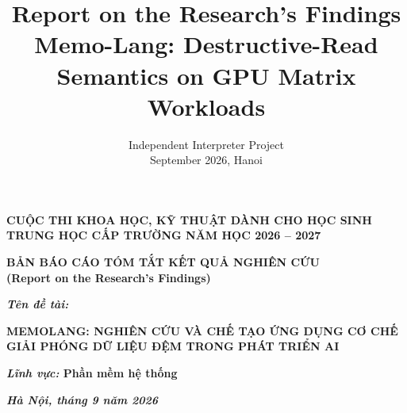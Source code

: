 \documentclass[a4paper]{article}
\begin{document}
	
	\title{Report on the Research's Findings \\
		{\large Memo-Lang: Destructive-Read Semantics on GPU Matrix Workloads}}
	
	\author{
		Independent Interpreter Project\\
		September 2026, Hanoi}
	
	\thispagestyle{plain}
	\begin{center}
		\bfseries
		CUỘC THI KHOA HỌC, KỸ THUẬT DÀNH CHO HỌC SINH TRUNG HỌC CẤP TRƯỜNG NĂM HỌC 2026 -- 2027
	\end{center}
	
	\vspace{5cm}
	
	\begin{center}
		\bfseries
		BẢN BÁO CÁO TÓM TẮT KẾT QUẢ NGHIÊN CỨU\\[4pt]
		{\normalfont (Report on the Research's Findings)}
	\end{center}
	
	\vspace{3cm}
	
	\begin{center}
		{\Large\bfseries\itshape Tên đề tài:}\\[10pt]
		{\Large\bfseries
		\MakeUppercase{MemoLang: Nghiên cứu và chế tạo ứng dụng cơ chế giải phóng dữ liệu đệm trong phát triển AI}\par}
	\end{center}
	
	\vspace{3cm}
	
	\noindent\textbf{\textit{Lĩnh vực:} Phần mềm hệ thống}
	
	\vspace{6pt}
	
	\vfill
	
	\begin{center}
		\textbf{\textit{Hà Nội, tháng 9 năm 2026}}
	\end{center}
	
	\newpage
	
	\tableofcontents
	
	\listoffigures
	\listoftables
	
\end{document}
